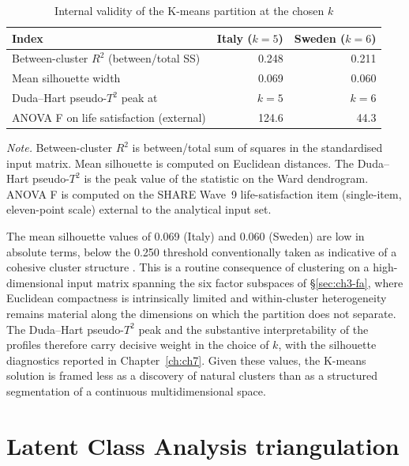 \begin{table}[!htbp]
  \centering
  \caption[Internal validity of the K-means partition]{Internal validity of the K-means partition at the chosen $k$}
  \label{tab:ch3-internal-validity}
  \begin{tabular}{lrr}
    \toprule
    \textbf{Index} & \textbf{Italy ($k = 5$)} & \textbf{Sweden ($k = 6$)} \\
    \midrule
    Between-cluster $R^2$ (between/total SS) & 0.248 & 0.211 \\
    Mean silhouette width & 0.069 & 0.060 \\
    Duda--Hart pseudo-$T^2$ peak at & $k = 5$ & $k = 6$ \\
    ANOVA F on life satisfaction (external) & 124.6 & 44.3 \\
    \bottomrule
  \end{tabular}
  \par\medskip
  \begin{minipage}{\linewidth}
    \footnotesize\textit{Note.} Between-cluster $R^2$ is between/total sum of squares in the standardised input matrix. Mean silhouette is computed on Euclidean distances. The Duda--Hart pseudo-$T^2$ is the peak value of the statistic on the Ward dendrogram. ANOVA F is computed on the SHARE Wave~9 life-satisfaction item (single-item, eleven-point scale) external to the analytical input set.
  \end{minipage}
\end{table}

The mean silhouette values of 0.069 (Italy) and 0.060 (Sweden) are low in absolute terms, below the 0.250 threshold conventionally taken as indicative of a cohesive cluster structure \citep{kaufman1990}. This is a routine consequence of clustering on a high-dimensional input matrix spanning the six factor subspaces of \S\ref{sec:ch3-fa}, where Euclidean compactness is intrinsically limited and within-cluster heterogeneity remains material along the dimensions on which the partition does not separate. The Duda--Hart pseudo-$T^2$ peak and the substantive interpretability of the profiles therefore carry decisive weight in the choice of $k$, with the silhouette diagnostics reported in Chapter~\ref{ch:ch7}. Given these values, the K-means solution is framed less as a discovery of natural clusters than as a structured segmentation of a continuous multidimensional space.
\section{Latent Class Analysis triangulation}
\label{sec:ch3-lca}


